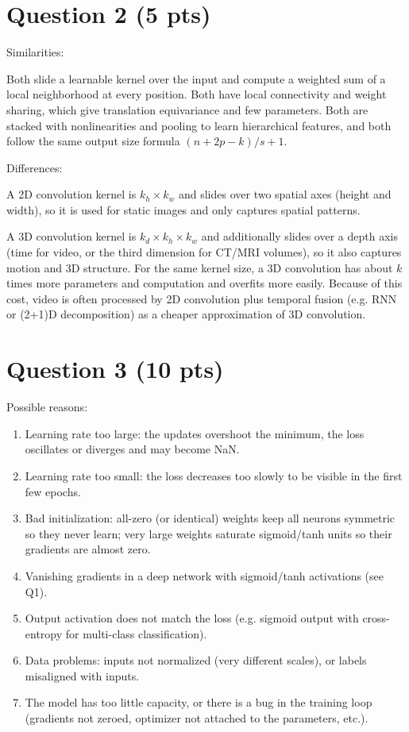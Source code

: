 \documentclass[11pt,a4paper]{article}
\begin{document}
\section*{Question 2 (5 pts)}

Similarities:

Both slide a learnable kernel over the input and compute a weighted sum
of a local neighborhood at every position. Both have local connectivity
and weight sharing, which give translation equivariance and few
parameters. Both are stacked with nonlinearities and pooling to learn
hierarchical features, and both follow the same output size formula
$(n+2p-k)/s+1$.

Differences:

A 2D convolution kernel is $k_h\times k_w$ and slides over two spatial
axes (height and width), so it is used for static images and only
captures spatial patterns.

A 3D convolution kernel is $k_d\times k_h\times k_w$ and additionally
slides over a depth axis (time for video, or the third dimension for
CT/MRI volumes), so it also captures motion and 3D structure. For the
same kernel size, a 3D convolution has about $k$ times more parameters
and computation and overfits more easily. Because of this cost, video is
often processed by 2D convolution plus temporal fusion (e.g. RNN or
(2+1)D decomposition) as a cheaper approximation of 3D convolution.

\section*{Question 3 (10 pts)}

Possible reasons:

\begin{enumerate}
    \item Learning rate too large: the updates overshoot the minimum,
    the loss oscillates or diverges and may become NaN.

    \item Learning rate too small: the loss decreases too slowly to be
    visible in the first few epochs.

    \item Bad initialization: all-zero (or identical) weights keep all
    neurons symmetric so they never learn; very large weights saturate
    sigmoid/tanh units so their gradients are almost zero.

    \item Vanishing gradients in a deep network with sigmoid/tanh
    activations (see Q1).

    \item Output activation does not match the loss (e.g. sigmoid
    output with cross-entropy for multi-class classification).

    \item Data problems: inputs not normalized (very different scales),
    or labels misaligned with inputs.

    \item The model has too little capacity, or there is a bug in the
    training loop (gradients not zeroed, optimizer not attached to the
    parameters, etc.).
\end{enumerate}
\end{document}
